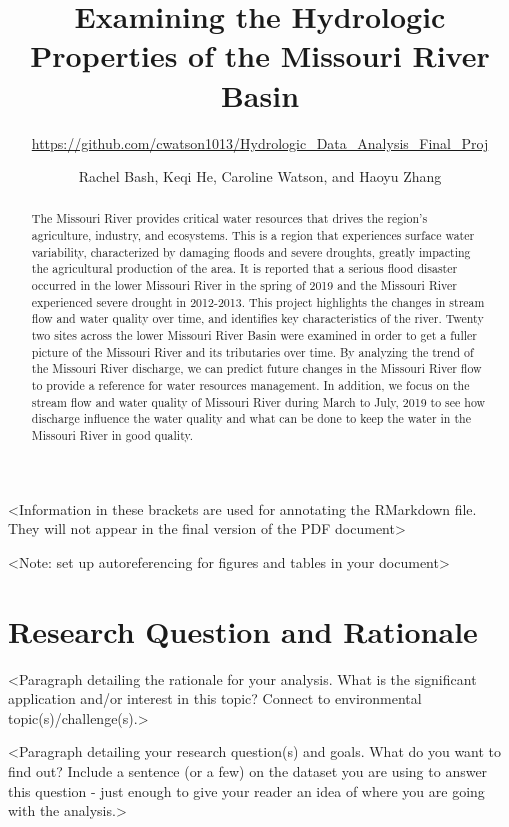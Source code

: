 \documentclass[12pt,]{article}
\title{Examining the Hydrologic Properties of the Missouri River Basin}
\subtitle{\url{https://github.com/cwatson1013/Hydrologic_Data_Analysis_Final_Proj}}
\author{Rachel Bash, Keqi He, Caroline Watson, and Haoyu Zhang}
\date{}
\begin{document}
\maketitle
\begin{abstract}
The Missouri River provides critical water resources that drives the
region's agriculture, industry, and ecosystems. This is a region that
experiences surface water variability, characterized by damaging floods
and severe droughts, greatly impacting the agricultural production of
the area. It is reported that a serious flood disaster occurred in the
lower Missouri River in the spring of 2019 and the Missouri River
experienced severe drought in 2012-2013. This project highlights the
changes in stream flow and water quality over time, and identifies key
characteristics of the river. Twenty two sites across the lower Missouri
River Basin were examined in order to get a fuller picture of the
Missouri River and its tributaries over time. By analyzing the trend of
the Missouri River discharge, we can predict future changes in the
Missouri River flow to provide a reference for water resources
management. In addition, we focus on the stream flow and water quality
of Missouri River during March to July, 2019 to see how discharge
influence the water quality and what can be done to keep the water in
the Missouri River in good quality.
\end{abstract}

\textless Information in these brackets are used for annotating the
RMarkdown file. They will not appear in the final version of the PDF
document\textgreater{}

\newpage
\tableofcontents 
\newpage
\listoftables 
\newpage
\listoffigures 
\newpage

\textless Note: set up autoreferencing for figures and tables in your
document\textgreater{}

\hypertarget{research-question-and-rationale}{%
\section{Research Question and
Rationale}\label{research-question-and-rationale}}

\textless Paragraph detailing the rationale for your analysis. What is
the significant application and/or interest in this topic? Connect to
environmental topic(s)/challenge(s).\textgreater{}

\textless Paragraph detailing your research question(s) and goals. What
do you want to find out? Include a sentence (or a few) on the dataset
you are using to answer this question - just enough to give your reader
an idea of where you are going with the analysis.\textgreater{}
\end{document}
